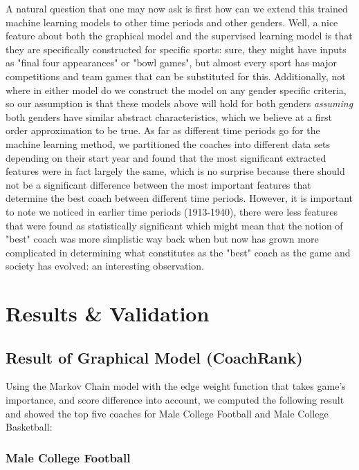 \documentclass[11pt,notitlepage]{article}
\begin{document}
\vspace{2 mm}

\noindent A natural question that one may now ask is first how can we extend this trained machine learning models to other time periods and other genders. Well, a nice feature about both the graphical model and the supervised learning model is that they are specifically constructed for specific sports: sure, they might have inputs as "final four appearances" or "bowl games", but almost every sport has major competitions and team games that can be substituted for this. Additionally, not where in either model do we construct the model on any gender specific criteria, so our assumption is that these models above will hold for both genders \textit{assuming} both genders have similar abstract characteristics, which we believe at a first order approximation to be true. As far as different time periods go for the machine learning method, we partitioned the coaches into different data sets depending on their start year and found that the most significant extracted features were in fact largely the same, which is no surprise because there should not be a significant difference between the most important features that determine the best coach between different time periods. However, it is important to note we noticed in earlier time periods (1913-1940), there were less features that were found as statistically significant which might mean that the notion of "best" coach was more simplistic way back when but now has grown more complicated in determining what constitutes as the "best" coach as the game and society has evolved: an interesting observation.    


\section{Results \& Validation}

\subsection{Result of Graphical Model (CoachRank)}

Using the Markov Chain model with the edge weight function that takes game's importance, and score difference into account, we computed the following result and showed the top five coaches for Male College Football and Male College Basketball:

\subsubsection*{Male College Football}
\end{document}
